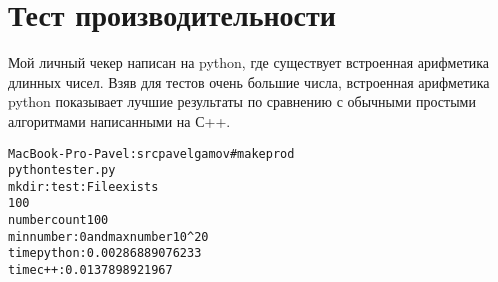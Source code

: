 \section{Тест производительности}

Мой личный чекер написан на python, где существует встроенная арифметика длинных чисел. Взяв для тестов очень большие числа, встроенная арифметика python показывает лучшие результаты по сравнению с обычными простыми алгоритмами написанными на С++. 

\begin{alltt}
MacBook-Pro-Pavel:src pavelgamov# make prod
python tester.py
mkdir: test: File exists
100
number count 100
min number : 0 and max number 10^20
time python : 0.00286889076233
time c++ : 0.0137898921967
\end{alltt}

\pagebreak
